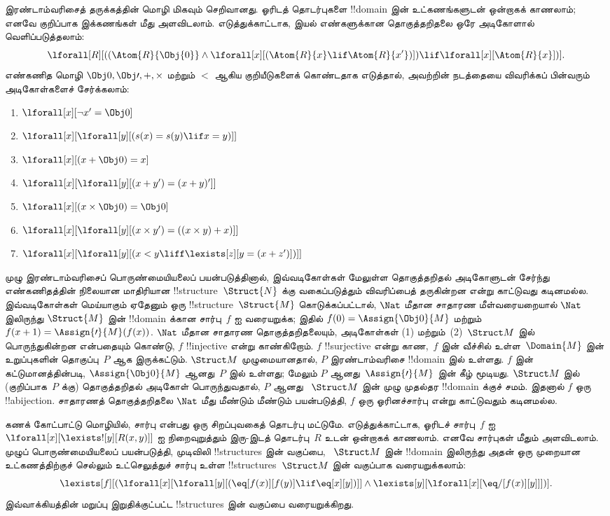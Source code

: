 \documentclass[../../../include/open-logic-section]{subfiles}
\begin{document}
இரண்டாம்வரிசைத் தருக்கத்தின் மொழி மிகவும் செறிவானது. ஓரிடத்
தொடர்புகளை !!{domain} இன் உட்கணங்களுடன் ஒன்றாகக் காணலாம்; எனவே
குறிப்பாக இக்கணங்கள் மீது அளவிடலாம். எடுத்துக்காட்டாக, இயல் எண்களுக்கான
தொகுத்தறிதலை ஒரே அடிகோளால் வெளிப்படுத்தலாம்:
\[
\lforall[R][((\Atom{R}{\Obj{0}} \land \lforall[x][(\Atom{R}{x} \lif
    \Atom{R}{x'})]) \lif \lforall[x][\Atom{R}{x}])].
\]
எண்கணித மொழி $\Obj 0, \Obj \prime, +, \times$ மற்றும் $<$ ஆகிய
குறியீடுகளைக் கொண்டதாக எடுத்தால், அவற்றின் நடத்தையை விவரிக்கப்
பின்வரும் அடிகோள்களைச் சேர்க்கலாம்:
\begin{enumerate}
\item $\lforall[x][\lnot x' = \Obj 0]$
\item $\lforall[x][\lforall[y][(s(x) = s(y) \lif x = y)]]$
\item $\lforall[x][(x + \Obj 0) = x]$
\item $\lforall[x][\lforall[y][(x + y') = (x + y)']]$
\item $\lforall[x][(x \times \Obj 0) = \Obj 0]$
\item $\lforall[x][\lforall[y][(x \times y') = ((x \times y) + x)]]$
\item $\lforall[x][\lforall[y][(x < y \liff \lexists[z][y = (x + z')])]]$
\end{enumerate}
முழு இரண்டாம்வரிசைப் பொருண்மையியலைப் பயன்படுத்தினால், இவ்வடிகோள்கள்
மேலுள்ள தொகுத்தறிதல் அடிகோளுடன் சேர்ந்து எண்கணிதத்தின் நிலையான
மாதிரியான !!{structure}~$\Struct{N}$ க்கு வகைப்படுத்தும் விவரிப்பைத்
தருகின்றன என்று காட்டுவது கடினமல்ல. இவ்வடிகோள்கள் மெய்யாகும் ஏதேனும்
ஒரு !!{structure}~$\Struct{M}$ கொடுக்கப்பட்டால், $\Nat$ மீதான சாதாரண
மீள்வரையறையால் $\Nat$ இலிருந்து $\Struct{M}$ இன் !!{domain} க்கான
சார்பு~$f$ ஐ வரையறுக்க; இதில் $f(0) = \Assign{\Obj 0}{M}$ மற்றும்
$f(x+1) = \Assign{\prime}{M}(f(x))$. $\Nat$ மீதான சாதாரண
தொகுத்தறிதலையும், அடிகோள்கள் (1) மற்றும்~(2)~$\Struct M$ இல்
பொருந்துகின்றன என்பதையும் கொண்டு, $f$ !!{injective} என்று காண்கிறோம்.
$f$ !!{surjective} என்று காண,~$f$ இன் வீச்சில் உள்ள~$\Domain{M}$ இன்
உறுப்புகளின் தொகுப்பு~$P$ ஆக இருக்கட்டும். $\Struct M$ முழுமையானதால்,
$P$ இரண்டாம்வரிசை !!{domain} இல் உள்ளது. $f$ இன் கட்டுமானத்தின்படி,
$\Assign{\Obj 0}{M}$ ஆனது~$P$ இல் உள்ளது; மேலும்
$P$ ஆனது~$\Assign{\prime}{M}$ இன் கீழ் மூடியது. $\Struct M$ இல்
(குறிப்பாக~$P$ க்கு) தொகுத்தறிதல் அடிகோள் பொருந்துவதால், $P$ ஆனது
~$\Struct M$ இன் முழு முதல்தர !!{domain} க்குச் சமம். இதனால் $f$
ஒரு !!a{bijection}. சாதாரணத் தொகுத்தறிதலை $\Nat$ மீது மீண்டும்
மீண்டும் பயன்படுத்தி, $f$ ஒரு ஓரினச்சார்பு என்று காட்டுவதும் கடினமல்ல.

கணக் கோட்பாட்டு மொழியில், சார்பு என்பது ஒரு சிறப்புவகைத் தொடர்பு
மட்டுமே. எடுத்துக்காட்டாக, ஓரிடச் சார்பு~$f$ ஐ
$\lforall[x][\lexists![y][R(x,y)]]$ ஐ நிறைவுறுத்தும் இரு-இடத்
தொடர்பு~$R$ உடன் ஒன்றாகக் காணலாம். எனவே சார்புகள் மீதும் அளவிடலாம்.
முழுப் பொருண்மையியலைப் பயன்படுத்தி, முடிவிலி !!{structure}s இன் வகுப்பை,
~$\Struct M$ இன் !!{domain} இலிருந்து அதன் ஒரு முறையான உட்கணத்திற்குச்
செல்லும் உட்செலுத்துச் சார்பு உள்ள !!{structure}s~$\Struct M$ இன்
வகுப்பாக வரையறுக்கலாம்:
\[
\lexists[f][(\lforall[x][\lforall[y][(\eq[f(x)][f(y)] \lif \eq[x][y])]]
  \land \lexists[y][\lforall[x][\eq/[f(x)][y]]])].
\]
இவ்வாக்கியத்தின் மறுப்பு இறுதிக்குட்பட்ட !!{structure}s இன் வகுப்பை
வரையறுக்கிறது.
\end{document}
